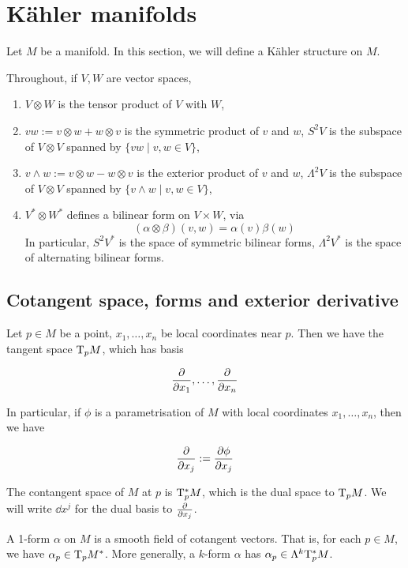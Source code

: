 \documentclass{article}
\begin{document}
\section{K\"ahler manifolds}

Let \(M\) be a manifold. In this section, we will define a K\"ahler structure on \(M\).

Throughout, if \(V, W\) are vector spaces,

\begin{enumerate}
    \item \(V \otimes W\) is the tensor product of \(V\) with \(W\),
    \item \(vw := v \otimes w + w \otimes v\) is the symmetric product of \(v\) and \(w\), \(S^2V\) is the subspace of \(V \otimes V\) spanned by \(\{vw \mid v, w \in V\}\),
    \item \(v \wedge w := v \otimes w - w\otimes v\) is the exterior product of \(v\) and \(w\), \(\Lambda^2 V\) is the subspace of \(V \otimes V\) spanned by \(\{v \wedge w \mid v, w \in V\}\),
    \item \(V^* \otimes W^*\) defines a bilinear form on \(V \times W\), via 
    \[(\alpha \otimes \beta)(v, w) = \alpha(v)\beta(w)\]
    In particular, \(S^2V^*\) is the space of symmetric bilinear forms, \(\Lambda^2 V^*\) is the space of alternating bilinear forms.
\end{enumerate}

\subsection{Cotangent space, forms and exterior derivative}

Let \(p \in M\) be a point, \(x_1, \dots, x_n\) be local coordinates near \(p\). Then we have the tangent space \(\mathrm{T}_p M\), which has basis

\[\pdv{x_1}, \dots, \pdv{x_n}\]

In particular, if \(\phi\) is a parametrisation of \(M\) with local coordinates \(x_1, \dots, x_n\), then we have

\[\pdv{x_j} := \pdv{\phi}{x_j}\]

\begin{definition}
     The contangent space of \(M\) at \(p\) is \(\mathrm{T}_p^*M\), which is the dual space to \(\mathrm{T}_pM\). We will write \(\dd x^j\) for the dual basis to \(\pdv{x_j}\).
\end{definition}

\begin{definition}
    [k-form] A 1-form \(\alpha\) on \(M\) is a smooth field of cotangent vectors. That is, for each \(p \in M\), we have \(\alpha_p \in \mathrm{T}_pM^*\). More generally, a \(k\)-form \(\alpha\) has \(\alpha_p \in \Lambda^k \mathrm{T}_p^*M\).
\end{definition}
\end{document}
